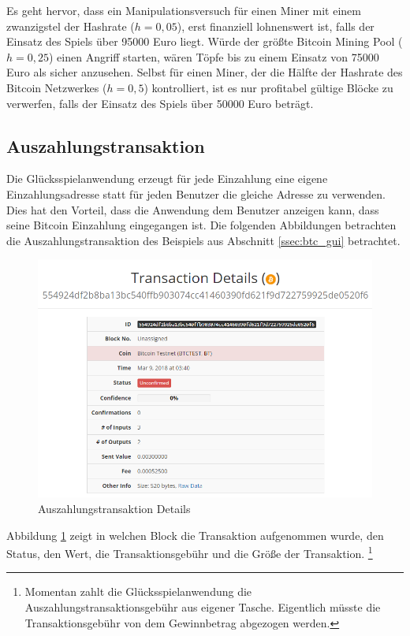 Es geht hervor, dass ein Manipulationsversuch für einen Miner mit einem zwanzigstel der Hashrate ($h=0,05$), erst finanziell lohnenswert ist, falls der Einsatz des Spiels über 95000 Euro liegt. Würde der größte Bitcoin Mining Pool ($h=0,25$) einen Angriff starten, wären Töpfe bis zu einem Einsatz von 75000 Euro als sicher anzusehen. Selbst für einen Miner, der die Hälfte der Hashrate des Bitcoin Netzwerkes ($h=0,5$) kontrolliert, ist es nur profitabel gültige Blöcke zu verwerfen, falls der Einsatz des Spiels über 50000 Euro beträgt.

\subsection{Auszahlungstransaktion} \label{sssec:Auszahlungstransaktion}
Die Glücksspielanwendung erzeugt für jede Einzahlung eine eigene Einzahlungsadresse statt für jeden Benutzer die gleiche Adresse zu verwenden. Dies hat den Vorteil, dass die Anwendung dem Benutzer anzeigen kann, dass seine Bitcoin Einzahlung eingegangen ist. Die folgenden Abbildungen betrachten die Auszahlungstransaktion des Beispiels aus Abschnitt \ref{ssec:btc_gui} betrachtet.

\begin{figure}[H]
\centering
\includegraphics[width=1\linewidth]{Figures/btc_gui/btc_txn}
\decoRule
\caption{Auszahlungstransaktion Details}
\label{fig:btc_txn}
\end{figure}

Abbildung \ref{fig:btc_txn} zeigt in welchen Block die Transaktion aufgenommen wurde, den Status, den Wert, die Transaktionsgebühr und die Größe der Transaktion.
\footnote{Momentan zahlt die Glücksspielanwendung die Auszahlungstransaktionsgebühr aus eigener Tasche. Eigentlich müsste die Transaktionsgebühr von dem Gewinnbetrag abgezogen werden.}

